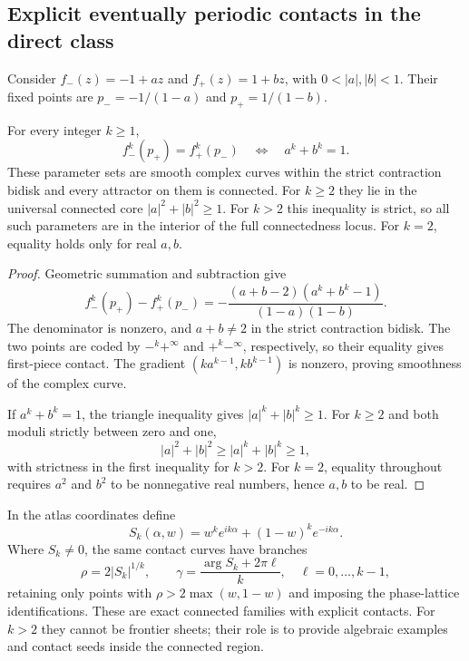 \subsection{Explicit eventually periodic contacts in the direct class}
\label{sec:restored-periodic-contacts}

Consider $f_-(z)=-1+az$ and $f_+(z)=1+bz$, with
$0<|a|,|b|<1$. Their fixed points are
$p_-=-1/(1-a)$ and $p_+=1/(1-b)$.

\begin{proposition}
\label{prop:restored-periodic-contacts}
For every integer $k\ge1$,
\begin{equation}\label{eq:restored-periodic-criterion}
 f_-^k(p_+)=f_+^k(p_-)
 \quad\Longleftrightarrow\quad a^k+b^k=1.
\end{equation}
These parameter sets are smooth complex curves within the strict
contraction bidisk and every attractor on them is connected.
For $k\ge2$ they lie in the universal connected core
$|a|^2+|b|^2\ge1$. For $k>2$ this inequality is strict, so all such
parameters are in the interior of the full connectedness locus.
For $k=2$, equality holds only for real $a,b$.
\end{proposition}

\begin{proof}
Geometric summation and subtraction give
\[
 f_-^k(p_+)-f_+^k(p_-)
 =-\frac{(a+b-2)(a^k+b^k-1)}{(1-a)(1-b)}.
\]
The denominator is nonzero, and $a+b\ne2$ in the strict contraction
bidisk. The two points are coded by $-^k+^{\infty}$ and
$+^k-^{\infty}$, respectively, so their equality gives first-piece
contact. The gradient $(ka^{k-1},kb^{k-1})$ is nonzero, proving
smoothness of the complex curve.

If $a^k+b^k=1$, the triangle inequality gives
$|a|^k+|b|^k\ge1$. For $k\ge2$ and both moduli strictly between
zero and one,
\[
 |a|^2+|b|^2\ge |a|^k+|b|^k\ge1,
\]
with strictness in the first inequality for $k>2$.
For $k=2$, equality throughout requires $a^2$ and $b^2$ to be
nonnegative real numbers, hence $a,b$ to be real.
\end{proof}

In the atlas coordinates define
\[
 S_k(\alpha,w)=w^ke^{ik\alpha}+(1-w)^ke^{-ik\alpha}.
\]
Where $S_k\ne0$, the same contact curves have branches
\[
 \rho=2|S_k|^{1/k},\qquad
 \gamma=\frac{\arg S_k+2\pi\ell}{k},
 \quad \ell=0,\ldots,k-1,
\]
retaining only points with $\rho>2\max(w,1-w)$ and imposing the
phase-lattice identifications. These are exact connected families
with explicit contacts. For $k>2$ they cannot be frontier sheets;
their role is to provide algebraic examples and contact seeds
inside the connected region.
